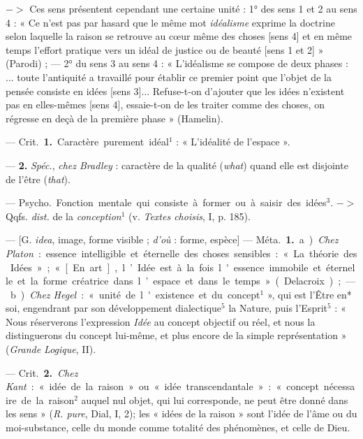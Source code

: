 \begin{itemize}[leftmargin=1cm, label=, itemsep=1pt]
$->$ Ces sens présentent cependant une certaine unité : 1° des sens 1 et 2
au sens 4 : « Ce n’est pas par hasard que le même mot {\it idéalisme}
exprime la doctrine selon laquelle la raison se retrouve au cœur même des
choses [sens 4] et en même temps l'effort pratique vers un idéal de justice
ou de beauté [sens 1 et 2] » (Parodi) ; — 2° du sens 3 au sens 4 : «
L’idéalisme se compose de deux phases : ... toute l'antiquité a travaillé
pour établir ce premier point que l’objet de la pensée consiste en idées
[sens 3]... Refuse-t-on d’ajouter que les idées n'existent pas en
elles-mêmes [sens 4], essaie-t-on de les traiter comme des choses, on
régresse en deçà de la première phase » (Hamelin).

 — \si{Crit.} {\bf 1.} Caractère purement idéal$^1$ : « L’idéalité de l’espace ».

— {\bf 2.} {\it Spéc.}, {\it chez Bradley} : caractère
de la qualité ({\it what}) quand elle est disjointe de l'être ({\it that}).

 — \si{Psycho.} Fonction mentale qui consiste à former ou à
saisir des idées$^3$. $->$ Qqfs. {\it dist.} de la {\it conception}$^1$
(v. {\it Textes choisis}, I, p. 185).

 — [G. {\it idea}, image, forme visible ; {\it d'où} : forme,
espèce] — \si{Méta.} {\bf 1.} a) {\it Chez Platon} : essence intelligible et
éternelle des choses sensibles : « La théorie des Idées »; « [En art],
l’Idée est à la fois l'essence immobile et éternelle et la forme créatrice
dans l’espace et dans le temps » (Delacroix); — b) {\it Chez Hegel} :
« unité de l'existence et du concept$^1$ », qui est l’Être en* soi,
engendrant par son développement dialectique$^5$ la Nature, puis
l'Esprit$^5$ : « Nous réserverons l'expression {\it Idée} au concept
objectif ou réel, et nous la distinguerons du concept lui-même, et plus
encore de la simple représentation » ({\it Grande Logique}, II).

— \si{Crit.} {\bf 2.} {\it Chez Kant} : « idée de la raison » ou « idée
transcendantale » : « concept nécessaire de la raison$^2$ auquel nul objet,
qui lui corresponde, ne peut être donné dans les sens » ({\it R. pure},
Dial, I, 2); les « idées de la raison » sont l'idée de l’âme ou du
moi-substance, celle du monde comme totalité des phénomènes, et celle de
Dieu.


\end{itemize}
